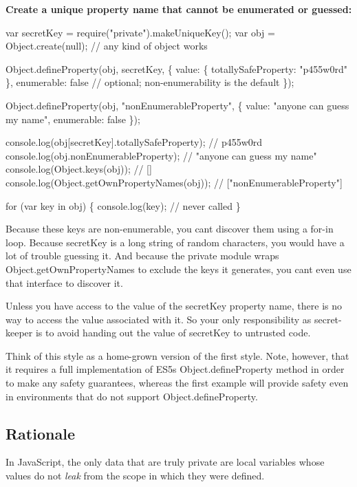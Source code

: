 {\bfseries Create a unique property name that cannot be enumerated or guessed\+:} 
\begin{DoxyCode}
var secretKey = require("private").makeUniqueKey();
var obj = Object.create(null); // any kind of object works

Object.defineProperty(obj, secretKey, \{
  value: \{ totallySafeProperty: "p455w0rd" \},
  enumerable: false // optional; non-enumerability is the default
\});

Object.defineProperty(obj, "nonEnumerableProperty", \{
  value: "anyone can guess my name",
  enumerable: false
\});

console.log(obj[secretKey].totallySafeProperty); // p455w0rd
console.log(obj.nonEnumerableProperty); // "anyone can guess my name"
console.log(Object.keys(obj)); // []
console.log(Object.getOwnPropertyNames(obj)); // ["nonEnumerableProperty"]

for (var key in obj) \{
  console.log(key); // never called
\}
\end{DoxyCode}
 Because these keys are non-\/enumerable, you can\textquotesingle{}t discover them using a {\ttfamily for}-\/{\ttfamily in} loop. Because {\ttfamily secret\+Key} is a long string of random characters, you would have a lot of trouble guessing it. And because the {\ttfamily private} module wraps {\ttfamily Object.\+get\+Own\+Property\+Names} to exclude the keys it generates, you can\textquotesingle{}t even use that interface to discover it.

Unless you have access to the value of the {\ttfamily secret\+Key} property name, there is no way to access the value associated with it. So your only responsibility as secret-\/keeper is to avoid handing out the value of {\ttfamily secret\+Key} to untrusted code.

Think of this style as a home-\/grown version of the first style. Note, however, that it requires a full implementation of E\+S5\textquotesingle{}s {\ttfamily Object.\+define\+Property} method in order to make any safety guarantees, whereas the first example will provide safety even in environments that do not support {\ttfamily Object.\+define\+Property}.

\subsection*{Rationale }

In Java\+Script, the only data that are truly private are local variables whose values do not {\itshape leak} from the scope in which they were defined.

